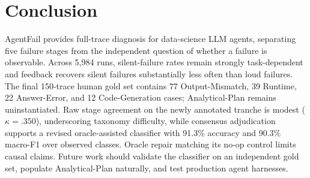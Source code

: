 \section{Conclusion}
\label{sec:conc}

AgentFail provides full-trace diagnosis for data-science LLM agents, separating five failure stages from the independent question of whether a failure is observable. Across 5{,}984 runs, silent-failure rates remain strongly task-dependent and feedback recovers silent failures substantially less often than loud failures. The final 150-trace human gold set contains 77 Output-Mismatch, 39 Runtime, 22 Answer-Error, and 12 Code-Generation cases; Analytical-Plan remains uninstantiated. Raw stage agreement on the newly annotated tranche is modest ($\kappa=.350$), underscoring taxonomy difficulty, while consensus adjudication supports a revised oracle-assisted classifier with 91.3\% accuracy and 90.3\% macro-F1 over observed classes. Oracle repair matching its no-op control limits causal claims. Future work should validate the classifier on an independent gold set, populate Analytical-Plan naturally, and test production agent harnesses.
